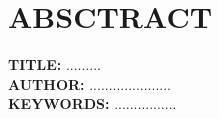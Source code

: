 \newpage
\chapter*{ABSCTRACT}
\label{sec:abst}

\textbf{TITLE:} .........\\

\textbf{AUTHOR:} .....................\\

\textbf{KEYWORDS: } ................\\


